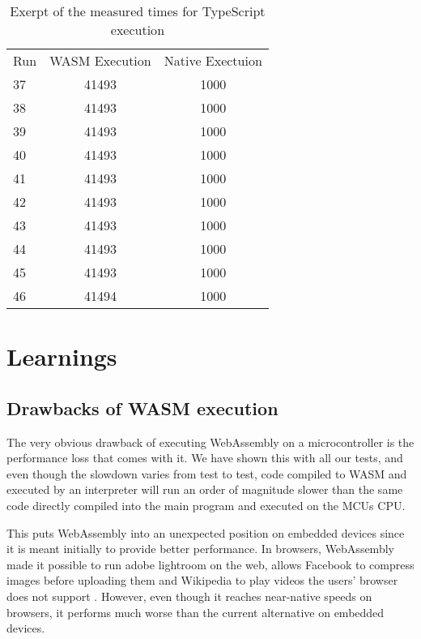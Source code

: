 \begin{table}[h]
    \begin{tabular}{l c c}
        Run & WASM Execution & Native Exectuion \\
        37  & 41493          & 1000             \\
        38  & 41493          & 1000             \\
        39  & 41493          & 1000             \\
        40  & 41493          & 1000             \\
        41  & 41493          & 1000             \\
        42  & 41493          & 1000             \\
        43  & 41493          & 1000             \\
        44  & 41493          & 1000             \\
        45  & 41493          & 1000             \\
        46  & 41494          & 1000             \\
    \end{tabular}
    \caption{Exerpt of the measured times for TypeScript execution}
    \label{tab:times_typeScript}
\end{table}

\section{Learnings}
\subsection{Drawbacks of WASM execution}
The very obvious drawback of executing WebAssembly on a microcontroller is the performance loss that comes with it. We have shown this with all our tests, and even though the slowdown varies from test to test, code compiled to WASM and executed by an interpreter will run an order of magnitude slower than the same code directly compiled into the main program and executed on the MCUs CPU.

This puts WebAssembly into an unexpected position on embedded devices since it is meant initially to provide better performance. In browsers, WebAssembly made it possible to run adobe lightroom on the web, allows Facebook to compress images before uploading them and Wikipedia to play videos the users' browser does not support \autocite{wagner_webassembly_2017}. However, even though it reaches near-native speeds on browsers, it performs much worse than the current alternative on embedded devices.

